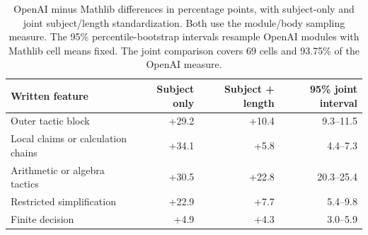 \begin{table}[H]
\centering\small
\caption{OpenAI minus Mathlib differences in percentage points, with subject-only and joint subject/length standardization. Both use the module/body sampling measure. The 95\% percentile-bootstrap intervals resample OpenAI modules with Mathlib cell means fixed. The joint comparison covers 69 cells and 93.75\% of the OpenAI measure.}
\label{tab:joint-profile}
\setlength{\tabcolsep}{4pt}
\renewcommand{\arraystretch}{1.18}
\begin{tabular}{@{}p{6.0cm}rrr@{}}
\toprule
Written feature & Subject only & Subject + length & 95\% joint interval \\
\midrule
Outer tactic block & +29.2 & +10.4 & 9.3--11.5 \\[5pt]
Local claims or calculation chains & +34.1 & +5.8 & 4.4--7.3 \\[5pt]
Arithmetic or algebra tactics & +30.5 & +22.8 & 20.3--25.4 \\[5pt]
Restricted simplification & +22.9 & +7.7 & 5.4--9.8 \\[5pt]
Finite decision & +4.9 & +4.3 & 3.0--5.9 \\[5pt]
\bottomrule
\end{tabular}
\end{table}
